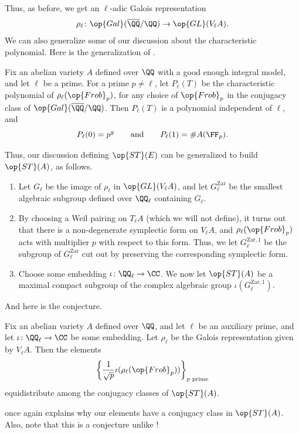 \documentclass{article}
\begin{document}
Thus, as before, we get an $\ell$-adic Galois representation
\[\rho_\ell\colon\op{Gal}(\overline\QQ/\QQ)\to\op{GL}(V_\ell A).\]
We can also generalize some of our discussion about the characteristic polynomial. Here is the generalization of .
\begin{proposition}
	Fix an abelian variety $A$ defined over $\QQ$ with a good enough integral model, and let $\ell$ be a prime. For a prime $p\ne\ell$, let $P_\ell(T)$ be the characteristic polynomial of $\rho_\ell({\op{Frob}_p})$, for any choice of $\op{Frob}_p$ in the conjugacy class of $\op{Gal}(\overline\QQ/\QQ)$. Then $P_\ell(T)$ is a polynomial independent of $\ell$, and
	\[P_\ell(0)=p^g\qquad\text{and}\qquad P_\ell(1)=\#A(\FF_p).\]
\end{proposition}
Thus, our discussion defining $\op{ST}(E)$ can be generalized to build $\op{ST}(A)$, as follows.
\begin{enumerate}
	\item Let $G_\ell$ be the image of $\rho_\ell$ in $\op{GL}(V_\ell A)$, and let $G_\ell^{\mathrm{Zar}}$ be the smallest algebraic subgroup defined over $\QQ_\ell$ containing $G_\ell$.
	\item By choosing a Weil pairing on $T_\ell A$ (which we will not define), it turns out that there is a non-degenerate symplectic form on $V_\ell A$, and $\rho_\ell({\op{Frob}_p})$ acts with multiplier $p$ with respect to this form. Thus, we let $G_\ell^{\mathrm{Zar},1}$ be the subgroup of $G_\ell^{\mathrm{Zar}}$ cut out by preserving the corresponding symplectic form.
	\item Choose some embedding $\iota\colon\QQ_\ell\to\CC$. We now let $\op{ST}(A)$ be a maximal compact subgroup of the complex algebraic group $\iota\left(G_\ell^{\mathrm{Zar},1}\right)$.
\end{enumerate}
And here is the conjecture.
\begin{conj} \label{conj:st}
	Fix an abelian variety $A$ defined over $\QQ$, and let $\ell$ be an auxiliary prime, and let $\iota\colon\QQ_\ell\to\CC$ be some embedding. Let $\rho_\ell$ be the Galois representation given by $V_\ell A$. Then the elements
	\[\left\{\frac1{\sqrt p}\iota(\rho_\ell({\op{Frob}_p}))\right\}_{p\text{ prime}}\]
	equidistribute among the conjugacy classes of $\op{ST}(A)$.
\end{conj}
 once again explains why our elements have a conjugacy class in $\op{ST}(A)$. Also, note that this is a conjecture unlike !
\end{document}
